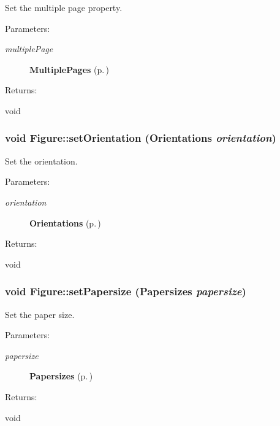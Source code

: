 Set the multiple page property. \begin{Desc}
\item[Parameters: ]\par
\begin{description}
\item[{\em 
multiple\-Page}]{\bf Multiple\-Pages} {\rm (p.\,\pageref{classFigure_s27})} \end{description}
\end{Desc}
\begin{Desc}
\item[Returns: ]\par
void \end{Desc}
\subsubsection{\setlength{\rightskip}{0pt plus 5cm}void Figure::set\-Orientation ({\bf Orientations} {\em orientation})\hspace{0.3cm}{\tt  [inline]}}\label{classFigure_a2}


Set the orientation. \begin{Desc}
\item[Parameters: ]\par
\begin{description}
\item[{\em 
orientation}]{\bf Orientations} {\rm (p.\,\pageref{classFigure_s23})} \end{description}
\end{Desc}
\begin{Desc}
\item[Returns: ]\par
void \end{Desc}
\subsubsection{\setlength{\rightskip}{0pt plus 5cm}void Figure::set\-Papersize ({\bf Papersizes} {\em papersize})\hspace{0.3cm}{\tt  [inline]}}\label{classFigure_a5}


Set the paper size. \begin{Desc}
\item[Parameters: ]\par
\begin{description}
\item[{\em 
papersize}]{\bf Papersizes} {\rm (p.\,\pageref{classFigure_s26})} \end{description}
\end{Desc}
\begin{Desc}
\item[Returns: ]\par
void \end{Desc}
